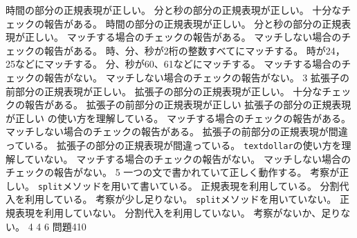 {	{
	{時間の部分の正規表現が正しい。}
	{分と秒の部分の正規表現が正しい。}
	{十分なチェックの報告がある。}
	}
	{
	{時間の部分の正規表現が正しい。}
	{分と秒の部分の正規表現が正しい。}
	{マッチする場合のチェックの報告がある。}
	{マッチしない場合のチェックの報告がある。}
	}
	{
	{時、分、秒が2桁の整数すべてにマッチする。}
	{時が24，25などにマッチする。}
	{分、秒が60、61などにマッチする。}
	{マッチする場合のチェックの報告がない。}
	{マッチしない場合のチェックの報告がない。}
	}
	{}{3}
	{
	{拡張子の前部分の正規表現が正しい。}
	{拡張子の部分の正規表現が正しい。}
	{十分なチェックの報告がある。}
	}
	{
	{拡張子の前部分の正規表現が正しい}
	{拡張子の部分の正規表現が正しい}
	{\texttt{\textdollar}の使い方を理解している。}
	{マッチする場合のチェックの報告がある。}
	{マッチしない場合のチェックの報告がある。}
	{}
	}
	{
	{拡張子の前部分の正規表現が間違っている。}
	{拡張子の部分の正規表現が間違っている。}
	{\texttt{textdollar}の使い方を理解していない。}
	{マッチする場合のチェックの報告がない。}
	{マッチしない場合のチェックの報告がない。}
	}
	{}{5}
	{
	{一つの文で書かれていて正しく動作する。}
	{考察が正しい。}
	}
	{
	{\texttt{split}メソッドを用いて書いている。}
	{正規表現を利用している。}
	{分割代入を利用している。}
	{考察が少し足りない。}
	}
	{
	{\texttt{split}メソッドを用いていない。}
	{正規表現を利用していない。}
	{分割代入を利用していない。}
	{考察がないか、足りない。}
	}
	{}{4}
	{
	{}
	}
	{
	{}
	}
	{
	}
	{}{4}
	{
	{}
	}
	{
	{}
	}
	{
	}
	{}{6}
	{
	{}
	}
	{
	{}
	}
	{
	}
	{問題4}{10}
	{
	{}
	}
	{
	{}
	}
	{
	}
}